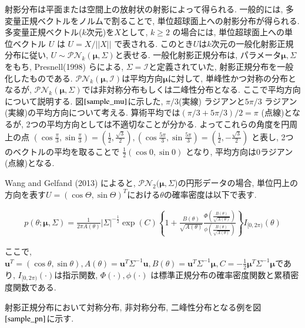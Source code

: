 \documentclass[a4j,11pt]{jarticle}
\begin{document}
射影分布は平面または空間上の放射状の射影によって得られる. 一般的には, 多変量正規ベクトルをノルムで割ることで, 単位超球面上への射影分布が得られる. 多変量正規ベクトル($k$次元)を$X$として, $k \geq 2$ の場合には, 単位超球面上への単位ベクトル $U$ は $U = X/||X||$ で表される. このとき$U$は$k$次元の一般化射影正規分布に従い, $U \sim \mathcal{PN}_k(\bm \mu,\Sigma)$と表せる. 一般化射影正規分布は, パラメータ$\bm \mu, \Sigma$をもち, Presnell(1998) らによる, $\Sigma = \mathcal{I}$と定義されていた, 射影正規分布を一般化したものである. $\mathcal{PN}_k(\bm \mu,\mathcal{I})$は平均方向$\bm \mu$に対して, 単峰性かつ対称の分布となるが, $\mathcal{PN}_k(\bm \mu,\Sigma)$では非対称分布もしくは二峰性分布となる. ここで平均方向について説明する. 図$\ref{sample_mu}$に示した, $\pi/3$(実線) ラジアンと$5\pi/3$ ラジアン (実線)の平均方向について考える. 算術平均では$(\pi/3 + 5\pi/3)/2 = \pi$ (点線)となるが, 2つの平均方向としては不適切なことが分かる. よってこれらの角度を円周上の点 $(\cos \frac{\pi}{3}, \sin \frac{\pi}{3}) = (\frac{1}{2},\frac{\sqrt{3}}{2}), (\cos \frac{5\pi}{3}, \sin \frac{5\pi}{3}) = (\frac{1}{2},- \frac{\sqrt{3}}{2})$ と表し, 2つのベクトルの平均を取ることで $\frac{1}{2} (\cos 0, \sin 0)$ となり, 平均方向は$0$ラジアン(点線)となる. 

Wang and Gelfand (2013) によると, $\mathcal{PN}_2(\bm \mu,\Sigma$)の円形データの場合, 単位円上の方向を表す$U = (\cos\Theta, \sin\Theta)^T$における$\theta$の確率密度は以下で表す.

\vspace{-1zh}
\begin{eqnarray*}
\label{PNC}
p(\theta; \bm \mu, \Sigma) = \frac{1}{2\pi A(\theta)}|\Sigma|^{-\frac{1}{2}}
\exp(C)\left\{1 + \frac{B(\theta)}{\sqrt{A(\theta)}} \frac{\Phi \left(\frac{B(\theta)}{\sqrt{A(\theta)}}\right)}{\phi \left(\frac{B(\theta)}{\sqrt{A(\theta)}}\right)}\right\} I_{[0,2\pi)}(\theta)
\end{eqnarray*}

\noindent
ここで, $\bm u^T = (\cos\theta,\sin\theta), A(\theta) = \bm u^T\Sigma^{-1}\bm u, B(\theta) = \bm u^T \Sigma^{-1} \bm \mu, C = -\frac{1}{2} \bm \mu^T \Sigma^{-1} \bm \mu$であり, $I_{[0,2\pi)} (\cdot)$は指示関数, $\Phi(\cdot), \phi(\cdot)$ は標準正規分布の確率密度関数と累積密度関数である.

射影正規分布において対称分布, 非対称分布, 二峰性分布となる例を図$\ref{sample_pn}$に示す. 
\end{document}
